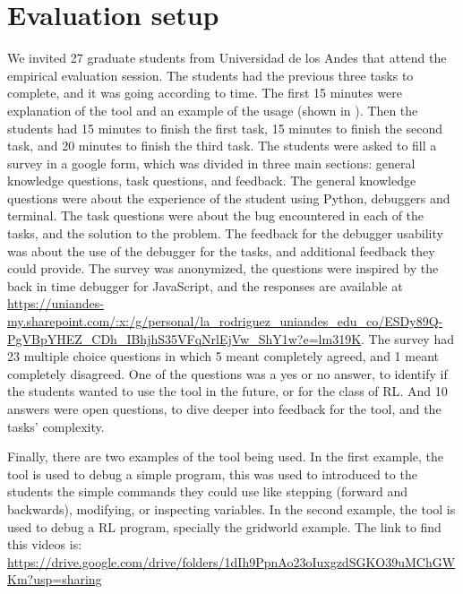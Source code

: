\section{Evaluation setup}
\label{sec:evaluation}
We invited 27 graduate students from Universidad de los Andes that attend the empirical evaluation session. 
The students had the previous three tasks to complete, and it was going according to time. The first 
15 minutes were explanation of the tool and an example of the usage (shown in ).
Then the students had 15 minutes to finish the first task, 15 minutes to finish the second task, and 
20 minutes to finish the third task. The students were asked to fill a survey in a google 
form, which was divided in three main sections: general knowledge questions, task questions, and feedback.
The general knowledge questions were about the experience of the student using Python, debuggers and 
terminal. The task questions were about the bug encountered in each of the tasks, and the solution 
to the problem. The feedback for the debugger usability was about the use of the debugger for the tasks, 
and additional feedback they could provide. The survey was anonymized, the questions were inspired by the 
back in time debugger for JavaScript\cite{delorean23}, and the responses are available 
at \url{https://uniandes-my.sharepoint.com/:x:/g/personal/la_rodriguez_uniandes_edu_co/ESDy89Q-PgVBpYHEZ_CDh_IBhjhS35VFqNrlEjVw_ShY1w?e=lm319K}.
The survey had 23 multiple choice questions in which 5 meant completely agreed, and 1 meant completely disagreed.
One of the questions was a yes or no answer, to identify if the students wanted to use the tool in the future,
or for the class of \ac{RL}. And 10 answers were open questions, to dive deeper into feedback for the tool,
and the tasks' complexity.

Finally, there are two examples of the tool being used. In the first 
example, the tool is used to debug a simple program, this was used to introduced to the students 
the simple commands they could use like stepping (forward and backwards), modifying, or inspecting 
variables. In the second example, the tool is used to debug a \ac{RL} program, specially 
the gridworld example. The link to find this videos is: \url{https://drive.google.com/drive/folders/1dIh9PpnAo23oIuxgzdSGKO39uMChGWKm?usp=sharing} 



\endinput

